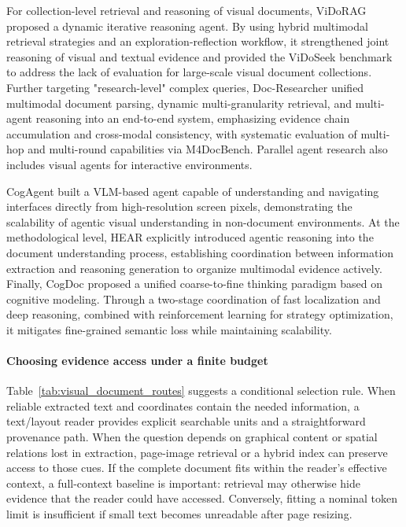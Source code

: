 For collection-level retrieval and reasoning of visual documents, ViDoRAG \cite{wang2025vidorag} proposed a dynamic iterative reasoning agent. By using hybrid multimodal retrieval strategies and an exploration-reflection workflow, it strengthened joint reasoning of visual and textual evidence and provided the ViDoSeek benchmark to address the lack of evaluation for large-scale visual document collections. Further targeting "research-level" complex queries, Doc-Researcher \cite{dong2025doc} unified multimodal document parsing, dynamic multi-granularity retrieval, and multi-agent reasoning into an end-to-end system, emphasizing evidence chain accumulation and cross-modal consistency, with systematic evaluation of multi-hop and multi-round capabilities via M4DocBench. Parallel agent research also includes visual agents for interactive environments.

CogAgent \cite{hong2024cogagent} built a VLM-based agent capable of understanding and navigating interfaces directly from high-resolution screen pixels, demonstrating the scalability of agentic visual understanding in non-document environments. At the methodological level, HEAR \cite{chen2025hear} explicitly introduced agentic reasoning into the document understanding process, establishing coordination between information extraction and reasoning generation to organize multimodal evidence actively. Finally, CogDoc \cite{xu2025cogdoc} proposed a unified coarse-to-fine thinking paradigm based on cognitive modeling. Through a two-stage coordination of fast localization and deep reasoning, combined with reinforcement learning for strategy optimization, it mitigates fine-grained semantic loss while maintaining scalability.

\paragraph{Choosing evidence access under a finite budget}
Table~\ref{tab:visual_document_routes} suggests a conditional selection rule. When reliable extracted text and coordinates contain the needed information, a text/layout reader provides explicit searchable units and a straightforward provenance path. When the question depends on graphical content or spatial relations lost in extraction, page-image retrieval or a hybrid index can preserve access to those cues. If the complete document fits within the reader's effective context, a full-context baseline is important: retrieval may otherwise hide evidence that the reader could have accessed. Conversely, fitting a nominal token limit is insufficient if small text becomes unreadable after page resizing.

